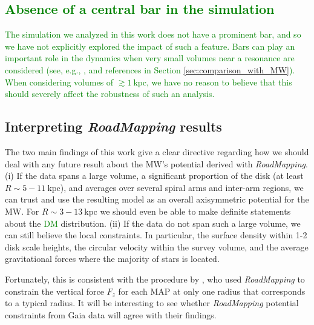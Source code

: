 \documentclass[iop,revtex4,numberedappendix,appendixfloats]{emulateapj}
\newcommand{\RM}{{\sl RoadMapping}}
\newcommand{\NEW}[1]{\textcolor{Green}{#1}}
\newcommand{\OLD}[1]{}
\begin{document}
\OLD{Overall, we expect that the MW spiral arms within a few kiloparsecs around the Sun are weaker than the arms in this galaxy simulation. \citet{2014ApJ...783..130R} measured, for example, that typical peculiar non-circular motions in the MW spiral arms were around $10-20~\text{km s}^{-1}$ for $R \gtrsim 4~\text{kpc}$, while Figure \ref{fig:DF_velres} suggests an excess of stars with radial velocities up to $50~\text{km s}^{-1}$ in our simulated galaxy.}

\subsection{\NEW{Absence of a central bar in the simulation}}

\NEW{The simulation we analyzed in this work does not have a prominent bar, and so we have not explicitly explored the impact of such a feature. Bars can play an important role in the dynamics when very small volumes near a resonance are considered (see, e.g., \citealt{2000AJ....119..800D}, and references in Section \ref{sec:comparison_with_MW}). When considering volumes of $\gtrsim 1~\text{kpc}$, we have no reason to believe that this should severely affect the robustness of such an analysis.}

\subsection{Interpreting \RM{} results}

The two main findings of this work give a clear directive regarding how we should deal with any future result about the MW's potential derived with \RM{}. (i) If the data spans a large volume, a significant proportion of the disk (at least $R\sim 5-11~\text{kpc}$), and averages over several spiral arms and inter-arm regions, we can trust and use the resulting model as an overall axisymmetric potential for the MW. For $R\sim 3-13~\text{kpc}$ we should even be able to make definite statements about the \OLD{dark matter}\NEW{DM} distribution. (ii) If the data do not span such a large volume, we can still believe the local constraints. In particular, the surface density within 1-2 disk scale heights, the circular velocity within the survey volume, and the average gravitational forces where the majority of stars is located.

Fortunately, this is consistent with the procedure by \citet{2013ApJ...779..115B}, who used \RM{} to constrain the vertical force $F_z$ for each MAP at only one radius that corresponds to a typical radius. It will be interesting to see whether \RM{} potential constraints from Gaia data will agree with their findings.
\end{document}
